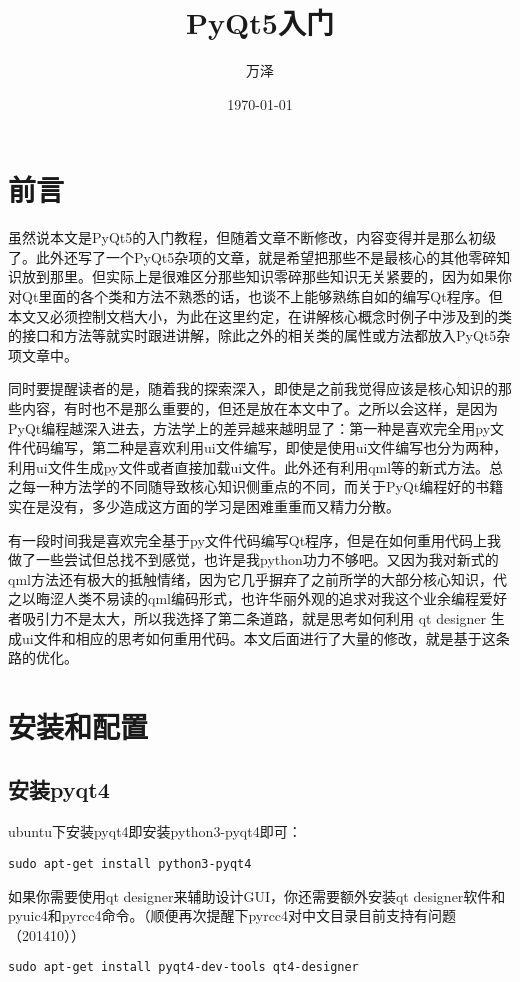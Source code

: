 \documentclass[11pt,oneside]{article}
\author{万泽}
\date{\today}
\title{PyQt5入门}
\begin{document}
\maketitle

\section{前言}
\label{sec:orgheadline1}
虽然说本文是PyQt5的入门教程，但随着文章不断修改，内容变得并是那么初级了。此外还写了一个PyQt5杂项的文章，就是希望把那些不是最核心的其他零碎知识放到那里。但实际上是很难区分那些知识零碎那些知识无关紧要的，因为如果你对Qt里面的各个类和方法不熟悉的话，也谈不上能够熟练自如的编写Qt程序。但本文又必须控制文档大小，为此在这里约定，在讲解核心概念时例子中涉及到的类的接口和方法等就实时跟进讲解，除此之外的相关类的属性或方法都放入PyQt5杂项文章中。

同时要提醒读者的是，随着我的探索深入，即使是之前我觉得应该是核心知识的那些内容，有时也不是那么重要的，但还是放在本文中了。之所以会这样，是因为PyQt编程越深入进去，方法学上的差异越来越明显了：第一种是喜欢完全用py文件代码编写，第二种是喜欢利用ui文件编写，即使是使用ui文件编写也分为两种，利用ui文件生成py文件或者直接加载ui文件。此外还有利用qml等的新式方法。总之每一种方法学的不同随导致核心知识侧重点的不同，而关于PyQt编程好的书籍实在是没有，多少造成这方面的学习是困难重重而又精力分散。

有一段时间我是喜欢完全基于py文件代码编写Qt程序，但是在如何重用代码上我做了一些尝试但总找不到感觉，也许是我python功力不够吧。又因为我对新式的qml方法还有极大的抵触情绪，因为它几乎摒弃了之前所学的大部分核心知识，代之以晦涩人类不易读的qml编码形式，也许华丽外观的追求对我这个业余编程爱好者吸引力不是太大，所以我选择了第二条道路，就是思考如何利用 qt designer 生成ui文件和相应的思考如何重用代码。本文后面进行了大量的修改，就是基于这条路的优化。


\section{安装和配置}
\label{sec:orgheadline4}

\subsection{安装pyqt4}
\label{sec:orgheadline2}
ubuntu下安装pyqt4即安装python3-pyqt4即可：
\begin{verbatim}
sudo apt-get install python3-pyqt4
\end{verbatim}


如果你需要使用qt designer来辅助设计GUI，你还需要额外安装qt designer软件和pyuic4和pyrcc4命令。（顺便再次提醒下pyrcc4对中文目录目前支持有问题（201410）） 
\begin{verbatim}
sudo apt-get install pyqt4-dev-tools qt4-designer
\end{verbatim}
\end{document}
